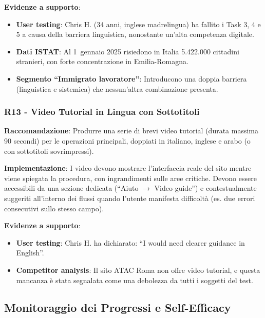 \documentclass[11pt,a4paper]{article}
\begin{document}
\textbf{Evidenze a supporto}:
\begin{itemize}
    \item \textbf{User testing}: Chris H. (34 anni, inglese madrelingua) ha
    fallito i Task 3, 4 e 5 a causa della barriera linguistica, nonostante
    un'alta competenza digitale.
    \item \textbf{Dati ISTAT}: Al 1\textdegree\ gennaio 2025 risiedono in Italia 5.422.000
    cittadini stranieri, con forte concentrazione in Emilia-Romagna.
    \item \textbf{Segmento “Immigrato lavoratore”}: Introducono una doppia
    barriera (linguistica e sistemica) che nessun'altra combinazione presenta.
\end{itemize}

\subsubsection{R13 - Video Tutorial in Lingua con Sottotitoli}
\label{rec:R13}

\textbf{Raccomandazione}: Produrre una serie di brevi video tutorial
(durata massima 90 secondi) per le operazioni principali, doppiati in
italiano, inglese e arabo (o con sottotitoli sovrimpressi).

\textbf{Implementazione}: I video devono mostrare l'interfaccia reale del
sito mentre viene spiegata la procedura, con ingrandimenti sulle aree critiche.
Devono essere accessibili da una sezione dedicata (“Aiuto $\rightarrow$ Video guide”)
e contestualmente suggeriti all'interno dei flussi quando l'utente manifesta
difficolt\`a (es. due errori consecutivi sullo stesso campo).

\textbf{Evidenze a supporto}:
\begin{itemize}
    \item \textbf{User testing}: Chris H. ha dichiarato: “I would need clearer
    guidance in English”.
    \item \textbf{Competitor analysis}: Il sito ATAC Roma non offre video
    tutorial, e questa mancanza \`e stata segnalata come una debolezza da
    tutti i soggetti del test.
\end{itemize}



\subsection{Monitoraggio dei Progressi e Self-Efficacy}
\end{document}
